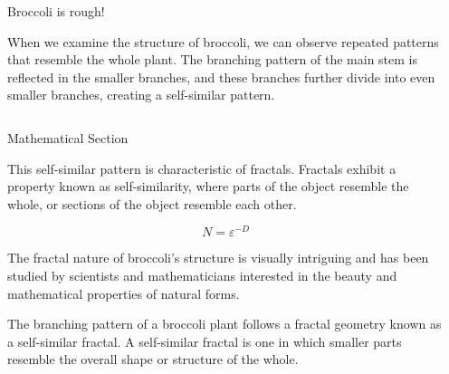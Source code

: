 \documentclass{beamer}
\begin{document}
\begin{frame}[t]
\begin{columns}[t]
\begin{column}{\twocolwid}
    \begin{alertblock}{Broccoli is rough!}
    
     When we examine the structure of broccoli, we can observe repeated patterns that resemble the whole plant. The branching pattern of the main stem is reflected in the smaller branches, and these branches further divide into even smaller branches, creating a self-similar pattern.
    
    \end{alertblock} 
    
    
    \begin{columns}[t,totalwidth=\twocolwid] %
    
    \begin{column}{\onecolwid} %
    
    
    \begin{block}{Mathematical Section}
    
    This self-similar pattern is characteristic of fractals. Fractals exhibit a property known as self-similarity, where parts of the object resemble the whole, or sections of the object resemble each other. 
    
    $$
    N = \varepsilon^{-D}
    $$
    
    The fractal nature of broccoli's structure is visually intriguing and has been studied by scientists and mathematicians interested in the beauty and mathematical properties of natural forms. 
    
    The branching pattern of a broccoli plant follows a fractal geometry known as a self-similar fractal. A self-similar fractal is one in which smaller parts resemble the overall shape or structure of the whole.  
    \end{block}
   
    
    
    \end{column} %
    
    \begin{column}{\onecolwid} %
    

\end{column}
\end{columns}
\end{column}
\end{columns}
\end{frame}
\end{document}
